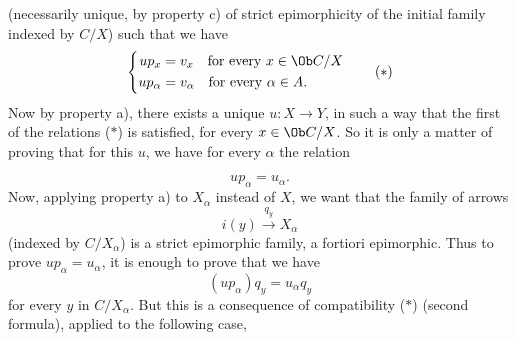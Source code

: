 (necessarily unique, by property c) of strict epimorphicity of the initial family indexed by $C/X$) such that we have
\[ \left\{\begin{aligned}
up_x &= v_x \quad \text{for every } x \in \Ob C/X\\ %
up_\alpha &= v_\alpha \quad \text{for every } \alpha \in A. %
\end{aligned}\right. \tag*{($*$)} \]
Now by property a), there exists a unique $u : X \longrightarrow Y$, in such a way that the first of the relations ($*$) is satisfied, for every $x \in \Ob C/X$. So it is only a matter of proving that for this $u$, we have for every $\alpha$ the relation

\[ up_\alpha = u_\alpha . \]
Now, applying property a) to $X_\alpha$ instead of $X$, we want that the family of arrows %
\[ i(y) \xrightarrow{q_y} X_\alpha \]
(indexed by $C/X_\alpha$) is a strict epimorphic family, a fortiori epimorphic. Thus to prove $up_\alpha = u_\alpha$, it is enough to prove that we have
\[ (up_\alpha)q_y = u_\alpha q_y \tag*{($**$)} \]
for every $y$ in $C/X_\alpha$. But this is a consequence of compatibility ($*$) (second formula), applied to the following case,
